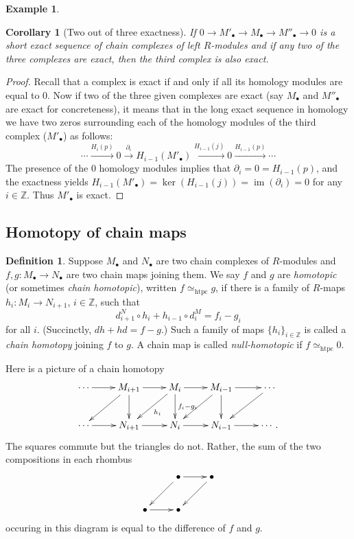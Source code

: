 \documentclass{amsart}[12pt]
\def\htpy{\simeq_{\mathrm{htpc}}}
\def\image{\operatorname{im}}
\def\im{\image}
\def\ker{\operatorname{ker}}
\newcommand{\Z}{\mathbb{Z}}
\numberwithin{equation}{section}
\theoremstyle{plain} %
\newtheorem{cor}[equation]{Corollary}
\theoremstyle{definition}
\newtheorem{defn}[equation]{Definition}
\newtheorem{ex}[equation]{Example}
\theoremstyle{remark}
\newcommand{\xra}[1]{\xrightarrow{#1}}
\begin{document}
\begin{ex}
\begin{comment}
\end{ex}
\end{comment}

\begin{cor}[Two out of three exactness]
 If $0 \to M'_\bullet \to M_\bullet \to M''_\bullet\to 0$ is a short exact sequence of chain complexes of left $R$-modules and if any two of the three complexes are exact, then the third complex is also exact.
\end{cor}
\begin{proof}
Recall that a complex is exact if and only if all its homology modules are equal to 0. Now if two of the three given complexes are exact (say $M_\bullet$ and $M''_\bullet$ are exact for concreteness), it means that in the long exact sequence in homology we have two zeros surrounding each of the homology modules of the third complex ($M'_\bullet$) as follows:
$$
      \cdots  \xra{H_i(p)} 0 \xra{\partial_i}
      H_{i-1}(M'_\bullet) \xra{H_{i-1}(j)} 0 \xra{H_{i-1}(p)} \cdots
      $$
      The presence of the 0 homology modules implies that $\partial_i=0=H_{i-1}(p)$, and the exactness yields $H_{i-1}(M'_\bullet)=\ker(H_{i-1}(j))=\im(\partial_i)=0$ for any $i\in \Z$. Thus $M'_\bullet$ is exact.
\end{proof}

\subsection{Homotopy of chain maps}

  \begin{defn} Suppose $M_\bullet$ and $N_\bullet$ are two chain complexes of $R$-modules and $f,g: M_\bullet \to N_\bullet$ are two chain maps joining them.
    We say $f$ and $g$ are 
{\em homotopic} (or sometimes {\em chain homotopic}), written $f \htpy g$,  if there is a family of $R$-maps $h_i: M_i \to N_{i+1}$, $i \in \Z$, such that
$$
d^N_{i+1} \circ h_i + h_{i-1} \circ d^M_i = f_i - g_i
$$
for all $i$. (Succinctly, $dh + hd = f -g$.) Such a  family of maps $\{h_i\}_{i \in \Z}$ is called a {\em chain homotopy} joining $f$ to $g$.
A chain map is called {\em null-homotopic} if $f \htpy 0$. 
 \end{defn}

 Here is a picture of a chain homotopy
 $$
 \xymatrix{
   \cdots \ar[r] & M_{i+1} \ar[r] \ar[d] \ar[ld] & M_{i} \ar[r] \ar[d]^{{\tiny f_i-g_i}} \ar[ld]^{{\tiny h_i}} & M_{i-1} \ar[r] \ar[d] \ar[ld] & \cdots \ar[ld] \\
 \cdots \ar[r] & N_{i+1} \ar[r] &N_{i} \ar[r] &N_{i-1} \ar[r] & \cdots. \\
}
$$
 The squares commute but the triangles do not. Rather, the sum of the two compositions in each rhombus
 $$
\xymatrix{
  &  \bullet \ar[dl] \ar[r] & \bullet \ar[ld] \\
  \bullet \ar[r] & \bullet \\
}
$$
occuring in this diagram is equal to the difference of $f$ and $g$. 


\end{ex}
\end{document}
